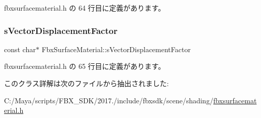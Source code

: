  fbxsurfacematerial.\+h の 64 行目に定義があります。

\mbox{\label{class_fbx_surface_material_a1286fd27069cdb5a3db79be1443783df}} 
\subsubsection{\texorpdfstring{s\+Vector\+Displacement\+Factor}{sVectorDisplacementFactor}}
{\footnotesize\ttfamily const char$\ast$ Fbx\+Surface\+Material\+::s\+Vector\+Displacement\+Factor\hspace{0.3cm}{\ttfamily [static]}}



 fbxsurfacematerial.\+h の 65 行目に定義があります。



このクラス詳解は次のファイルから抽出されました\+:\begin{DoxyCompactItemize}
\item 
C\+:/\+Maya/scripts/\+F\+B\+X\+\_\+\+S\+D\+K/2017./include/fbxsdk/scene/shading/\hyperlink{fbxsurfacematerial_8h}{fbxsurfacematerial.\+h}\end{DoxyCompactItemize}
